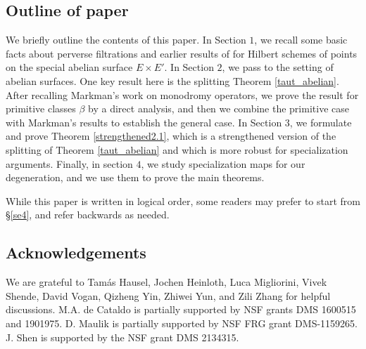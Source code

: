 \subsection{Outline of paper}

We briefly outline the contents of this paper.  In Section $1$, we recall some basic facts about perverse filtrations and earlier results of \cite{Z,SZ} for Hilbert schemes of points on the special abelian surface $E \times E'$.
In Section $2$, we pass to the setting of abelian surfaces.  One  key result  here is the splitting Theorem \ref{taut_abelian}.  After recalling Markman's work on monodromy operators, we prove the result for primitive classes $\beta$ by a direct analysis, and then we combine the primitive case with Markman's results  to establish the general case.
In Section $3$, we formulate and prove  Theorem \ref{strengthened2.1},  which is a strengthened version of the splitting of Theorem \ref{taut_abelian} and which  is  more robust for specialization arguments.
Finally, in section $4$, we study  specialization maps for our degeneration, and we use them to prove the main theorems.

While this paper is written in logical order, some readers may prefer to start from \S\ref{se4}, and refer backwards as needed.




\subsection{Acknowledgements}
We are grateful to Tam\'as Hausel, Jochen Heinloth, Luca Migliorini, Vivek Shende, David Vogan, Qizheng Yin, Zhiwei Yun, and Zili Zhang for helpful discussions.  M.A. de Cataldo is partially supported by NSF grants DMS 1600515 and 1901975.  D. Maulik is partially supported by NSF FRG grant DMS-1159265. J. Shen is supported by the NSF grant DMS 2134315.
